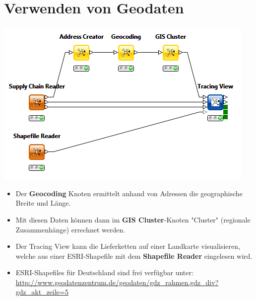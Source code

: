 \documentclass{beamer}
\begin{document}
\section{Verwenden von Geodaten}
\begin{frame}
	\begin{center}
  		\includegraphics[height=0.4\textheight]{3.png}
	\end{center}
	\begin{itemize}
		\item Der \textbf{Geocoding} Knoten ermittelt anhand von Adressen die geographische Breite und Länge.
		\item Mit diesen Daten können dann im \textbf{GIS Cluster}-Knoten "Cluster" (regionale Zusammenhänge) errechnet werden.
		\item Der Tracing View kann die Lieferketten auf einer Landkarte visualisieren, welche aus einer ESRI-Shapefile mit dem \textbf{Shapefile Reader} eingelesen wird.
		\item ESRI-Shapefiles für Deutschland sind frei verfügbar unter: \url{http://www.geodatenzentrum.de/geodaten/gdz_rahmen.gdz_div?gdz_akt_zeile=5}
	\end{itemize}		
\end{frame}
\end{document}
